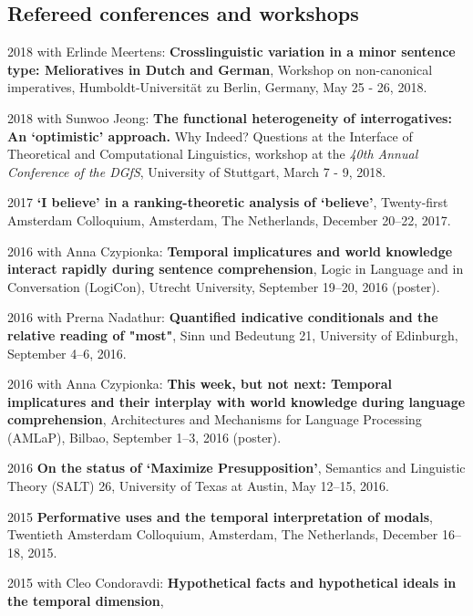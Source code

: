 \subsection*{Refereed conferences and workshops}
\begin{dated}
	\item[2018]
		with Erlinde Meertens:
		\textbf{Crosslinguistic variation in a minor sentence type: Melioratives in Dutch and German},
		Workshop on non-canonical imperatives,
		Humboldt-Universität zu Berlin, Germany,
		May 25 - 26, 2018.
	\item[2018]
		with Sunwoo Jeong: 
		\textbf{The functional heterogeneity of interrogatives: An `optimistic' approach.}
		{Why Indeed? Questions at the Interface of Theoretical and Computational Linguistics}, 
		workshop at the \textit{40th Annual Conference of the DGfS}, 
		University of Stuttgart, 
		March 7 - 9, 2018.
	\item[2017]
		\textbf{`I believe' in a ranking-theoretic analysis of `believe'}, 
		Twenty-first Amsterdam Colloquium, Amsterdam, The Netherlands,
		December 20--22, 2017.
	\item[2016]
		with Anna Czypionka: 
		\textbf{Temporal implicatures and world knowledge interact rapidly during sentence comprehension}, 
		Logic in Language and in Conversation (LogiCon), 
		Utrecht University, 
		September 19--20, 2016 (poster).
	\item[2016]
		with Prerna Nadathur: 
		\textbf{Quantified indicative conditionals and the relative reading of "most"}, 
		Sinn und Bedeutung 21, 
		University of Edinburgh, 
		September 4--6, 2016.
	\item[2016]
		with Anna Czypionka: 
		\textbf{This week, but not next: Temporal implicatures and their interplay with world knowledge during language comprehension}, 
		Architectures and Mechanisms for Language Processing (AMLaP), 
		Bilbao, 
		September 1--3, 2016 (poster).
	\item[2016]
		\textbf{On the status of `Maximize Presupposition'}, 
		Semantics and Linguistic Theory (SALT) 26, 
		University of Texas at Austin, 
		May 12--15, 2016.
	\item[2015]
		\textbf{Performative uses and the temporal interpretation of modals}, 
		Twentieth Amsterdam Colloquium, 
		Amsterdam, The Netherlands, 
		December 16--18, 2015.
	\item[2015]
		with Cleo Condoravdi: \textbf{Hypothetical facts and hypothetical ideals in the temporal dimension}, 

\end{dated}
